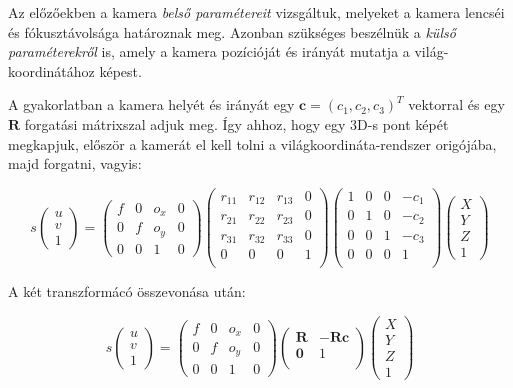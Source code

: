 Az előzőekben a kamera \textit{belső paramétereit} vizsgáltuk, melyeket a kamera lencséi és fókusztávolsága határoznak meg. Azonban szükséges beszélnük a \textit{külső paraméterekről} is, amely a kamera pozícióját és irányát mutatja a világ-koordinátához képest.

A gyakorlatban a kamera helyét és irányát egy $\mathbf{c} = (c_1, c_2, c_3)^T$ vektorral és egy $\mathbf{R}$ forgatási mátrixszal adjuk meg. Így ahhoz, hogy egy 3D-s pont képét megkapjuk, először a kamerát el kell tolni a világkoordináta-rendszer origójába, majd forgatni, vagyis:

\[s \left(\begin{array}{c}
u \\ 
v \\
1
\end{array}\right) = \left(\begin{array}{cccc}
f & 0 & o_x & 0 \\ 
0 & f & o_y & 0 \\
0 & 0 & 1 & 0
\end{array}\right) \left(\begin{array}{cccc}
r_{11} & r_{12} & r_{13} & 0 \\ 
r_{21} & r_{22} & r_{23} & 0 \\ 
r_{31} & r_{32} & r_{33} & 0 \\ 
0 & 0 & 0 & 1 \\ 
\end{array}\right) \left(\begin{array}{cccc}
1 & 0 & 0 & -c_1 \\ 
0 & 1 & 0 & -c_2 \\ 
0 & 0 & 1 & -c_3 \\ 
0 & 0 & 0 & 1 \\ 
\end{array}\right) \left(\begin{array}{c}
X \\ 
Y \\
Z \\
1
\end{array}\right)\]

A két transzformácó összevonása után:

\[s \left(\begin{array}{c}
u \\ 
v \\
1
\end{array}\right) = \left(\begin{array}{cccc}
f & 0 & o_x & 0 \\ 
0 & f & o_y & 0 \\
0 & 0 & 1 & 0
\end{array}\right) \left(\begin{array}{cc}
\mathbf{R} & -\mathbf{R} \mathbf{c} \\ 
\mathbf{0} & 1 \\ 
\end{array}\right) \left(\begin{array}{c}
X \\ 
Y \\
Z \\
1
\end{array}\right)\]

